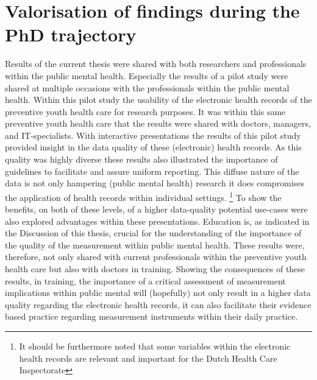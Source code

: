 \section*{Valorisation of findings during the PhD trajectory}
Results of the current thesis were shared with both researchers and professionals within the public mental health. 
Especially the results of a pilot study \parencite{Hoofs_DDJGZ} were shared at multiple occasions with the professionals within the public mental health.
Within this pilot study the usability of the electronic health records of the preventive youth health care for research purposes. 
It was within this same preventive youth health care that the results were shared with doctors, managers, and IT-specialists. 
With interactive presentations the results of this pilot study provided insight in the data quality of these (electronic) health records. 
As this quality was highly diverse these results also illustrated the importance of guidelines to facilitate and assure uniform reporting. 
This diffuse nature of the data is not only hampering (public mental health) research it does compromises the application of health records within individual settings.
\footnote{It should be furthermore noted that some variables within the electronic health records are relevant and important for the Dutch Health Care Inspectorate} 
To show the benefits, on both of these levels, of a higher data-quality potential use-cases were also explored advantages within these presentations. 
Education is, as indicated in the Discussion of this thesis, crucial for the understanding of the importance of the quality of the measurement within public mental health.
These results were, therefore, not only shared with current professionals within the preventive youth health care but also with doctors in training. 
Showing the consequences of these results, in training, the importance of a critical assessment of measurement implications within public mental will (hopefully) not only result in a higher data quality regarding the electronic health records, it can also facilitate their evidence based practice regarding measurement instruments within their daily practice.

